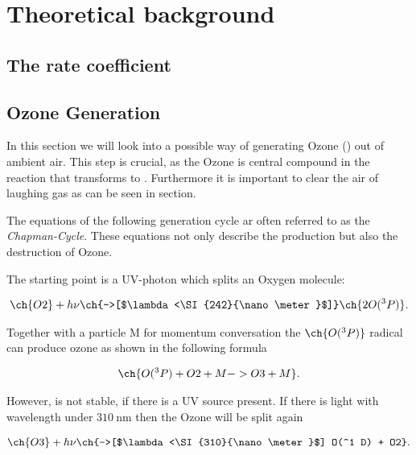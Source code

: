 \section{Theoretical background}
\label{sec:theory}


\subsection{The rate coefficient}
\label{sec:rate}



\subsection{Ozone Generation}
\label{sec:theory-ozone}

In this section we will look into a possible way of generating Ozone
() out of ambient air. This step is crucial, as the Ozone is
central compound in the reaction that transforms  to
. Furthermore it is important to clear the air of laughing
gas as can be seen in section.

The equations of the following generation cycle ar often referred to
as the \emph{Chapman-Cycle}. These equations not only
describe the production but also the destruction of Ozone.

The starting point is a UV-photon which splits an Oxygen molecule:

\begin{align*}
  \ch{O2} + h\nu \ch{->[$\lambda<\SI{242}{\nano\meter}$]} \ch{2 O(^3P)}.
\end{align*}

Together with a particle M for momentum conversation the $\ch{O(^3
  P)}$ radical can produce ozone as shown in the following formula

\begin{align}
  \ch{O(^3 P) + O2 + M -> O3 + M}. \label{eq:ozone}
\end{align}

However,  is not stable, if there is a UV source present. If
there is light with wavelength under $\SI{310}{\nano\meter}$ then the
Ozone will be split again

\begin{align}
  \ch{O3} + h\nu \ch{->[$\lambda<\SI{310}{\nano\meter}$] O(^1 D) +
  O2}. \label{eq:split}
\end{align}

